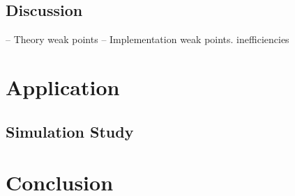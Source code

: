 \documentclass{article}
\begin{document}
    \subsection{Discussion}
    -- Theory weak points
    -- Implementation weak points. inefficiencies



  \section{Application}

    \subsection{Simulation Study}

  \section{Conclusion}




  
  


  
\end{document}
